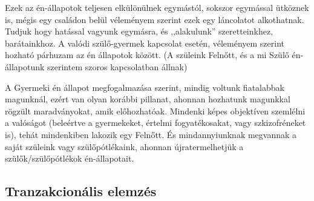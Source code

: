 \documentclass[a4paper,12pt]{article}
\begin{document}
	Ezek az én-állapotok teljesen elkülönülnek egymástól, sokszor egymással ütköznek is, mégis egy családon belül véleményem szerint ezek egy láncolatot alkothatnak. Tudjuk hogy hatással vagyunk egymásra, és ,,alakulunk'' szeretteinkhez, barátainkhoz. A valódi szülő-gyermek kapcsolat esetén, véleményem szerint hozható párhuzam az én állapotok között. (A szüleink Felnőtt, és a mi Szülő én-állapotunk szerintem szoros kapcsolatban állnak)
	
	A Gyermeki én állapot megfogalmazása szerint, mindig voltunk fiatalabbak magunknál, ezért van olyan korábbi pillanat, ahonnan hozhatunk magunkkal rögzült maradványokat, amik előhozhatóak. 
	Mindenki képes objektíven szemlélni a valóságot (beleértve a gyermekeket, értelmi fogyatékosakat, vagy szkizofréneket is), tehát mindenkiben lakozik egy Felnőtt. És mindannyiunknak megvannak a saját szüleink vagy szülőpótlékaink, ahonnan újratermelhetjük a szülők/szülőpótlékok én-állapotait. 
	
	\subsection{Tranzakcionális elemzés}
\end{document}
